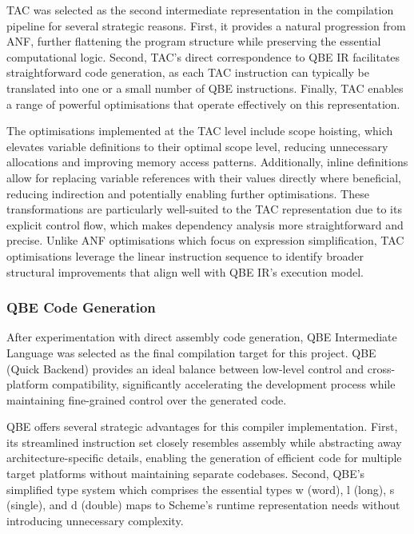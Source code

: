 \documentclass[final]{cmpreport_02}
\begin{document}
TAC was selected as the second intermediate representation in the compilation pipeline for several strategic reasons. First, it provides a natural progression from ANF, further flattening the program structure while preserving the essential computational logic. Second, TAC's direct correspondence to QBE IR facilitates straightforward code generation, as each TAC instruction can typically be translated into one or a small number of QBE instructions. Finally, TAC enables a range of powerful optimisations that operate effectively on this representation.\newline

The optimisations implemented at the TAC level include scope hoisting, which elevates variable definitions to their optimal scope level, reducing unnecessary allocations and improving memory access patterns. Additionally, inline definitions allow for replacing variable references with their values directly where beneficial, reducing indirection and potentially enabling further optimisations. These transformations are particularly well-suited to the TAC representation due to its explicit control flow, which makes dependency analysis more straightforward and precise. Unlike ANF optimisations which focus on expression simplification, TAC optimisations leverage the linear instruction sequence to identify broader structural improvements that align well with QBE IR's execution model.

\subsubsection{QBE Code Generation}
After experimentation with direct assembly code generation, QBE Intermediate Language \cite{qbe_il} was selected as the final compilation target for this project. QBE (Quick Backend) provides an ideal balance between low-level control and cross-platform compatibility, significantly accelerating the development process while maintaining fine-grained control over the generated code.\newline

QBE offers several strategic advantages for this compiler implementation. First, its streamlined instruction set closely resembles assembly while abstracting away architecture-specific details, enabling the generation of efficient code for multiple target platforms without maintaining separate codebases. Second, QBE's simplified type system which comprises the essential types w (word), l (long), s (single), and d (double) maps to Scheme's runtime representation needs without introducing unnecessary complexity.\newline
\end{document}
